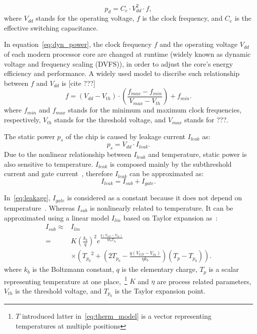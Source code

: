 \begin{equation}\label{eq:dyn_power}
p_{d} = C_{e} \cdot V_{dd}^{2} \cdot f,
\end{equation}
where $V_{dd}$ stands for the operating voltage, $f$ is the clock frequency, and $C_{e}$ is the effective switching capacitance.

In equation~\eqref{eq:dyn_power}, the clock frequency $f$ and the operating voltage $V_{dd}$ of each modern processor core are changed at runtime (widely known as dynamic voltage and frequency scaling (DVFS)), in order to adjust the core's energy efficiency and performance. 
A widely used model to discribe such relationship between $f$ and $V_{dd}$ is [cite ???]
\begin{equation}\label{eq:f_v}
f = (V_{dd}-V_{th}) \cdot (\frac{f_{max}-f_{min}}{V_{max}-V_{th}})+f_{min}.
\end{equation}
where $f_{min}$ and $f_{max}$ stands for the minimum and maximum clock frequencies, respectively, $V_{th}$ stands for the threshold voltage, and $V_{max}$ stands for ???.

The static power $p_{s}$ of the chip is caused by leakage current $I_{leak}$ as:
\begin{equation}\label{eq:sta_power}
p_{s} =V_{dd} \cdot I_{leak}.
\end{equation}
Due to the nonlinear relationship between $I_{leak}$ and temperature, static power is also sensitive to temperature. $I_{leak}$ is composed mainly by the subthreshold current and gate current~\cite{Liu:DATE'07,ShenTan:TODAES'12,WangWan:TOC'18}, therefore $I_{leak}$ can be approximated as:
\begin{equation}\label{eq:leakage}
I_{leak}=I_{sub}+I_{gate}.
\end{equation}

In~\eqref{eq:leakage}, $I_{gate}$ is considered as a constant because it does not depend on temperature~\cite{WangWan:TOC'18}. Whereas $I_{sub}$ is nonlinearly related to temperature. It can be approximated using a linear model $I_{lin}$ based on Taylor expansion as~\cite{WangWan:TOC'18}:
\begin{equation}\label{eq:sub_current_lin}
  \begin{split}
    I_{sub} \approx & I_{lin} \\
     =& K (\frac{k_b}{q})^2 e^{\frac{q(V_{GS}-V_{th})}{\eta k_b
    T_{p_0}}}\\
&\times ({T_{p_0}}^2 + (2T_{p_0} - \frac{q(V_{GS}-V_{th})}{\eta
  k_b})(T_p-T_{p_0})).
\end{split}
\end{equation}
where $k_b$ is the Boltzmann constant, $q$ is the elementary charge, $T_{p}$ is a scalar representing temperature at one place,~\footnote{$T$
introduced latter in~\eqref{eq:therm_model} is a vector representing temperatures at multiple positions} $K$ and $\eta$ are
process related parameters, $V_{th}$ is the threshold voltage, and $T_{p_0}$ is the Taylor expansion point.

